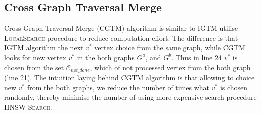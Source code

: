 \documentclass{article}
\begin{document}
\subsection{Cross Graph Traversal Merge}

Cross Graph Traversal Merge (\textsc{CGTM}) algorithm is similar to \textsc{IGTM} utilise \textsc{LocalSearch} procedure to reduce computation effort. The difference is that \textsc{IGTM} algorithm the next $v^*$ vertex choice from the same graph, while \textsc{CGTM} looks for new vertex $v^*$ in the both graphs $G^a$, and $G^b$. 
Thus in line 24  $v^*$  is chosen from the set $\mathcal{C}_{not\_done}$, which of not processed vertex from the both graph (line 21). The intuition laying behind \textsc{CGTM} algorithm is that allowing to choice new $v^*$ from the both graphs, we reduce the number of times what $v^*$ is chosen randomly, thereby minimise the number of using more expensive search procedure \textsc{HNSW-Search}.
\end{document}
